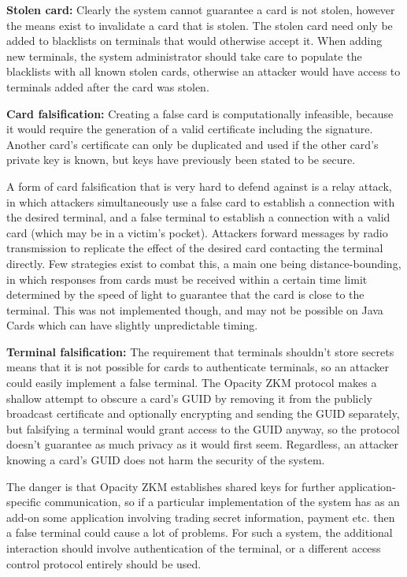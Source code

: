 \documentclass[12pt]{article}
\begin{document}
\textbf{Stolen card:} Clearly the system cannot guarantee a card is not stolen, however the means exist to invalidate a card that is stolen. The stolen card need only be added to blacklists on terminals that would otherwise accept it. When adding new terminals, the system administrator should take care to populate the blacklists with all known stolen cards, otherwise an attacker would have access to terminals added after the card was stolen.

\textbf{Card falsification:} Creating a false card is computationally infeasible, because it would require the generation of a valid certificate including the signature. Another card's certificate can only be duplicated and used if the other card's private key is known, but keys have previously been stated to be secure.

A form of card falsification that is very hard to defend against is a relay attack, in which attackers simultaneously use a false card to establish a connection with the desired terminal, and a false terminal to establish a connection with a valid card (which may be in a victim's pocket). Attackers forward messages by radio transmission to replicate the effect of the desired card contacting the terminal directly. Few strategies exist to combat this, a main one being distance-bounding, in which responses from cards must be received within a certain time limit determined by the speed of light to guarantee that the card is close to the terminal. This was not implemented though, and may not be possible on Java Cards which can have slightly unpredictable timing.

\textbf{Terminal falsification:} The requirement that terminals shouldn't store secrets means that it is not possible for cards to authenticate terminals, so an attacker could easily implement a false terminal. The Opacity ZKM protocol makes a shallow attempt to obscure a card's GUID by removing it from the publicly broadcast certificate and optionally encrypting and sending the GUID separately, but falsifying a terminal would grant access to the GUID anyway, so the protocol doesn't guarantee as much privacy as it would first seem. Regardless, an attacker knowing a card's GUID does not harm the security of the system.

The danger is that Opacity ZKM establishes shared keys for further application-specific communication, so if a particular implementation of the system has as an add-on some application involving trading secret information, payment etc. then a false terminal could cause a lot of problems. For such a system, the additional interaction should involve authentication of the terminal, or a different access control protocol entirely should be used.
\end{document}
